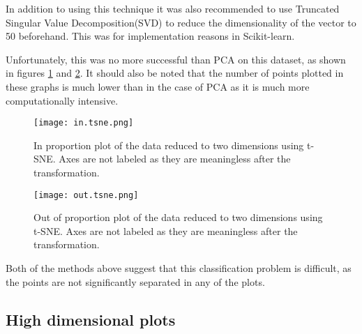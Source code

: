 In addition to using this technique it was also recommended to use Truncated Singular Value Decomposition(SVD) to reduce the dimensionality of the vector to 50 beforehand.
This was for implementation reasons in Scikit-learn.

Unfortunately, this was no more successful than \ac{PCA} on this dataset, as shown in figures \ref{fig:intsne} and \ref{fig:outtsne}.
It should also be noted that the number of points plotted in these graphs is much lower than in the case of \ac{PCA} as it is much more computationally intensive.

\begin{figure}
    \texttt{[image: in.tsne.png]}
    \centering
    \caption{In proportion plot of the data reduced to two dimensions using t-SNE. Axes are not labeled as they are meaningless after the transformation.}
    \label{fig:intsne}
\end{figure}

\begin{figure}
    \texttt{[image: out.tsne.png]}
    \centering
    \caption{Out of proportion plot of the data reduced to two dimensions using t-SNE. Axes are not labeled as they are meaningless after the transformation.}
    \label{fig:outtsne}
\end{figure}

Both of the methods above suggest that this classification problem is difficult, as the points are not significantly separated in any of the plots.

\subsection{High dimensional plots}

